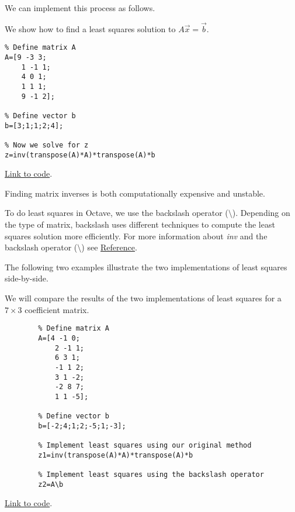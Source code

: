 \documentclass{ximera}
\begin{document}
We can implement this process as follows.

\begin{template}\label{temp:leastSq}
    We show how to find a least squares solution to $A\vec{x}=\vec{b}$.

    \begin{verbatim}
% Define matrix A
A=[9 -3 3;
    1 -1 1;
    4 0 1;
    1 1 1; 
    9 -1 2];
        
% Define vector b
b=[3;1;1;2;4];

% Now we solve for z
z=inv(transpose(A)*A)*transpose(A)*b
    \end{verbatim}

\href{https://sagecell.sagemath.org/?z=eJxTVXBJTcvMS1XITSwpyqxQcOTlcrSNtlTQNVYwtublUgACQwVdQwVDKMdEwQDONgRBawUIxxKkyigWKgUCvFyqMMPLUpNL8osUkni5kmyjja0NgdDI2gSkGKTIL79coTxVoTg_pyxVIQ2oroqXq8o2M69Mo6QoMa-4IL84VcNRUwuIUPhJAN_XLTM=&lang=octave&interacts=eJyLjgUAARUAuQ==}{Link to code}.    
\end{template}

\begin{warning}
    Finding matrix inverses is both computationally expensive and unstable.  
\end{warning}

To do least squares in Octave, we use the backslash operator ($\setminus$). Depending on the type of matrix, backslash uses different techniques to compute the least squares solution more efficiently.  For more information about \emph{inv} and the backslash operator ($\setminus$) see \href{https://www.mathworks.com/help/matlab/ref/inv.html}{Reference}.

The following two examples illustrate the two implementations of least squares side-by-side.

\begin{example}\label{ex:LeastSquaresComp1}
  We will compare the results of the two implementations of least squares for a $7\times 3$ coefficient matrix.
  
      \begin{verbatim}
        % Define matrix A
        A=[4 -1 0;
            2 -1 1;
            6 3 1;
            -1 1 2; 
            3 1 -2;
            -2 8 7;
            1 1 -5];
                
        % Define vector b
        b=[-2;4;1;2;-5;1;-3];
        
        % Implement least squares using our original method
        z1=inv(transpose(A)*A)*transpose(A)*b
        
        % Implement least squares using the backslash operator
        z2=A\b        
      \end{verbatim}
  
  \href{https://sagecell.sagemath.org/?z=eJyNjstqwzAQRfcC_cPdBNKAIFZeBeGFoZt-Q5qFlExiUVtyJDmUfn0l4hSyyzAwc2buPGb4oLN1hF6nYH_QcNbU-zVEhaXiDNlkgWqCLVb_eSlDKtwp1yHkoyXxjt0ERSY2h4mKcTZ73L3RMfkAw5mp93l-rSolldjkIFZlpmg_-6GjnlxCRzomxOuoA0WM0boL_Bjgg71Ypzv0lFp_4uy3qq27zVPQLg4-0rx5W2R_YvPK9tQSjD5-x07HFn6goPPD-YCsmy_zB_2HVXs=&lang=octave&interacts=eJyLjgUAARUAuQ==}{Link to code}.   
  
  \end{example}
  
\end{document}
